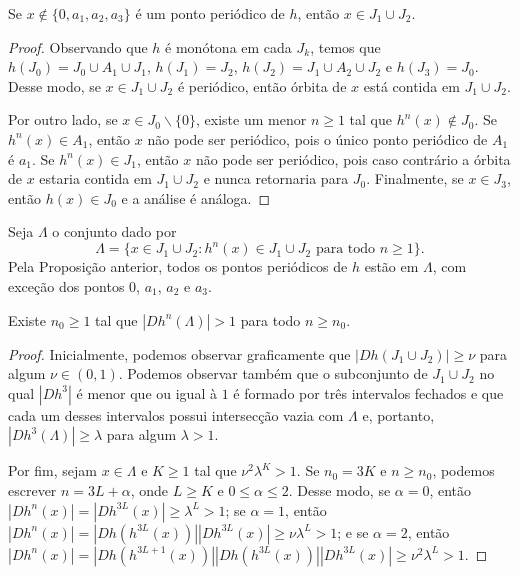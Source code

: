 \begin{proposition}
Se $x \notin \lbrace 0, a_1, a_2, a_3 \rbrace$ é um ponto periódico de $h$, então $x \in J_1 \cup J_2$.
\end{proposition}

\begin{proof}
Observando que $h$ é monótona em cada $J_k$, temos que $h(J_0) = J_0 \cup A_1 \cup J_1$, $h(J_1) = J_2$, $h(J_2) = J_1 \cup A_2 \cup J_2$ e $h(J_3) = J_0$. Desse modo, se $x \in J_1 \cup J_2$ é periódico, então órbita de $x$ está contida em $J_1 \cup J_2$.

Por outro lado, se $x \in J_0 \backslash \lbrace 0 \rbrace$, existe um menor $n \geq 1$ tal que $h^n(x) \notin J_0$. Se $h^n(x) \in A_1$, então $x$ não pode ser periódico, pois o único ponto periódico de $A_1$ é $a_1$.
Se $h^n(x) \in J_1$, então $x$ não pode ser periódico, pois caso contrário a órbita de $x$ estaria contida em $J_1 \cup J_2$ e nunca retornaria para $J_0$.
Finalmente, se $x \in J_3$, então $h(x) \in J_0$ e a análise é análoga.
\end{proof}

Seja $\Lambda$ o conjunto dado por
$$\Lambda = \lbrace x \in J_1 \cup J_2 : h^n(x) \in J_1 \cup J_2 \text{ para todo } n \geq 1 \rbrace.$$
Pela Proposição anterior, todos os pontos periódicos de $h$ estão em $\Lambda$, com exceção dos pontos $0$, $a_1$, $a_2$ e $a_3$.

\begin{lemma}
Existe $n_0 \geq 1$ tal que $|D h^n(\Lambda)| > 1$ para todo $n \geq n_0$.
\end{lemma}

\begin{proof}
Inicialmente, podemos observar graficamente que $|D h(J_1 \cup J_2)| \geq \nu$ para algum $\nu \in (0, 1)$.
Podemos observar também que o subconjunto de $J_1 \cup J_2$ no qual $|D h^3|$ é menor que ou igual à $1$ é formado por três intervalos fechados e que cada um desses intervalos possui intersecção vazia com $\Lambda$ e, portanto, $|D h^3(\Lambda)| \geq \lambda$ para algum $\lambda > 1$.

Por fim, sejam $x \in \Lambda$ e $K \geq 1$ tal que $\nu^2 \lambda^K > 1$. Se $n_0 = 3K$ e $n \geq n_0$, podemos escrever $n = 3L + \alpha$, onde $L \geq K$ e $0 \leq \alpha \leq 2$. Desse modo, se $\alpha = 0$, então $ |D h^n(x)| = |D h^{3L}(x)|
\geq \lambda^L > 1$; se $\alpha = 1$, então $|D h^n(x)| = |D h(h^{3L}(x))| |D h^{3L}(x)| \geq \nu \lambda^L > 1$; e se $\alpha = 2$, então $|D h^n(x)| = |D h(h^{3L+1}(x))| |D h(h^{3L}(x))| |D h^{3L}(x)| \geq \nu^2 \lambda^L > 1$.
\end{proof}

